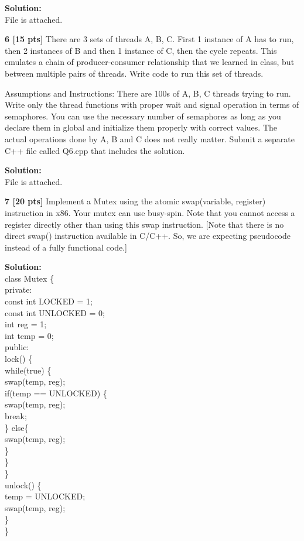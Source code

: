 \documentclass[12pt]{article}
\newcommand\tab[1][1cm]{\hspace*{#1}}
\begin{document}
{\bf Solution:}\\

File is attached.

{\bf 6 [15 pts]} There are 3 sets of threads A, B, C. First 1 instance of A has to run, then 2 instances of B and then 1 instance of C, then the cycle repeats. This emulates a chain of producer-consumer relationship that we learned in class, but between multiple pairs of threads. Write code to run this set of threads.

Assumptions and Instructions: There are 100s of A, B, C threads trying to run. Write only the thread functions with proper wait and signal operation in terms of semaphores. You can use the necessary number of semaphores as long as you declare them in global and initialize them properly with correct values. The actual operations done by A, B and C does not really matter. Submit a separate C++ file called Q6.cpp that includes the solution.

{\bf Solution:}\\

File is attached.

{\bf 7 [20 pts]} Implement a Mutex using the atomic swap(variable, register) instruction in x86. Your mutex can use busy-spin. Note that you cannot access a register directly other than using this swap instruction. [Note that there is no direct swap() instruction available in C/C++. So, we are expecting pseudocode instead of a fully functional code.]

{\bf Solution:}\\

\noindent
class Mutex \{\\
private:\\
\tab const int LOCKED = 1;\\
\tab const int UNLOCKED = 0;\\
\tab int reg = 1;\\
\tab int temp = 0;\\
public:\\
\tab lock() \{\\
\tab\tab while(true) \{\\
\tab\tab\tab swap(temp, reg);\\
\tab\tab\tab if(temp == UNLOCKED) \{\\
\tab\tab\tab\tab swap(temp, reg);\\
\tab\tab\tab\tab break;\\
\tab\tab\tab \} else\{\\
\tab\tab\tab\tab swap(temp, reg);\\
\tab\tab\tab \}\\
\tab\tab \}\\
\tab \}\\
\tab unlock() \{\\
\tab\tab temp = UNLOCKED;\\
\tab\tab swap(temp, reg);\\
\tab \}\\
\}
\end{document}
